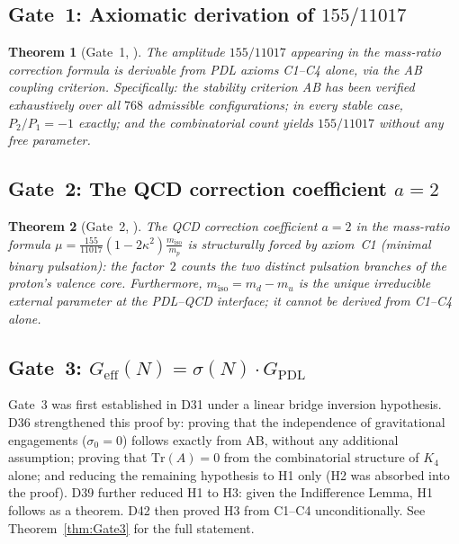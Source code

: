 \documentclass[11pt,a4paper]{article}
\theoremstyle{plain}
\newtheorem{theorem}{Theorem}[section]
\theoremstyle{definition}
\theoremstyle{remark}
\newcommand{\Geff}{G_{\mathrm{eff}}}
\newcommand{\GPDL}{G_{\mathrm{PDL}}}
\newcommand{\sigmaN}{\sigma(N)}
\begin{document}
\subsection{Gate~1: Axiomatic derivation of \texorpdfstring{$155/11017$}{155/11017}}
\label{subsec:gate1}
\begin{theorem}[Gate~1, \cite{D29}]
\label{thm:Gate1}
The amplitude $155/11017$ appearing in the mass-ratio correction formula is derivable from PDL axioms C1--C4 alone, via the AB coupling criterion. Specifically: the stability criterion AB has been verified exhaustively over all $768$ admissible configurations; in every stable case, $P_2/P_1=-1$ exactly; and the combinatorial count yields $155/11017$ without any free parameter.
\end{theorem}

\subsection{Gate~2: The QCD correction coefficient \texorpdfstring{$a=2$}{a=2}}
\label{subsec:gate2}
\begin{theorem}[Gate~2, \cite{D30}]
\label{thm:Gate2}
The QCD correction coefficient $a=2$ in the mass-ratio formula $\mu=\frac{155}{11017}(1-2\kappa^2)\frac{m_{\mathrm{iso}}}{m_p}$ is structurally forced by axiom~C1 (minimal binary pulsation): the factor~$2$ counts the two distinct pulsation branches of the proton's valence core. Furthermore, $m_{\mathrm{iso}}=m_d-m_u$ is the unique irreducible external parameter at the PDL--QCD interface; it cannot be derived from C1--C4 alone.
\end{theorem}

\subsection{Gate~3: \texorpdfstring{$\Geff(N)=\sigmaN\cdot\GPDL$}{Geff(N)=sigmaN·GPDL}}
\label{subsec:gate3}
Gate~3 was first established in D31 under a linear bridge inversion hypothesis. D36 strengthened this proof by: proving that the independence of gravitational engagements ($\sigma_0=0$) follows exactly from AB, without any additional assumption; proving that $\mathrm{Tr}(A)=0$ from the combinatorial structure of $K_4$ alone; and reducing the remaining hypothesis to H1 only (H2 was absorbed into the proof). D39 further reduced H1 to H3: given the Indifference Lemma, H1 follows as a theorem. D42 then proved H3 from C1--C4 unconditionally. See Theorem~\ref{thm:Gate3} for the full statement.
\end{document}
